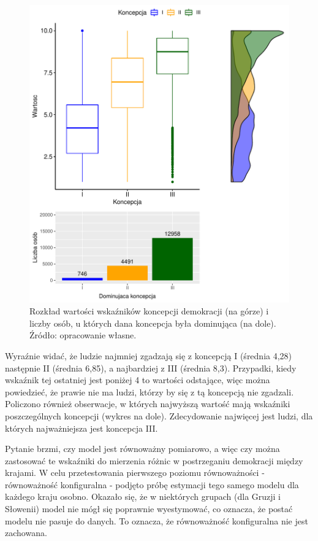 \documentclass[12pt]{article}
\begin{document}
\begin{figure}

{\centering \includegraphics{text_ASA_files/figure-latex/stats-all-1} 

}

\caption{Rozkład wartości wskaźników koncepcji demokracji (na górze) i liczby osób, u których dana koncepcja była dominująca (na dole). Źródło: opracowanie własne.}\label{fig:stats-all}
\end{figure}

Wyraźnie widać, że ludzie najmniej zgadzają się z koncepcją I (średnia 4,28) następnie II (średnia 6,85), a najbardziej z III (średnia 8,3). Przypadki, kiedy wskaźnik tej ostatniej jest poniżej 4 to wartości odstające, więc można powiedzieć, że prawie nie ma ludzi, którzy by się z tą koncepcją nie zgadzali. Policzono również obserwacje, w których najwyższą wartość mają wskaźniki poszczególnych koncepcji (wykres na dole). Zdecydowanie najwięcej jest ludzi, dla których najważniejsza jest koncepcja III.

Pytanie brzmi, czy model jest równoważny pomiarowo, a więc czy można zastosować te wskaźniki do mierzenia różnic w postrzeganiu demokracji między krajami. W celu przetestowania pierwszego poziomu równoważności - równoważność konfiguralna - podjęto próbę estymacji tego samego modelu dla każdego kraju osobno. Okazało się, że w niektórych grupach (dla Gruzji i Słowenii) model nie mógł się poprawnie wyestymować, co oznacza, że postać modelu nie pasuje do danych. To oznacza, że równoważność konfiguralna nie jest zachowana.
\end{document}
